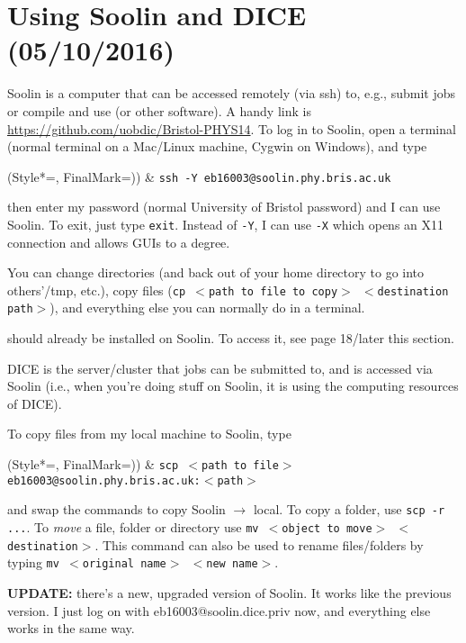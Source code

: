 
\chapter{Using Soolin and DICE (05/10/2016)}
\label{sec:usingsoolindice}

Soolin is a computer that can be accessed remotely (via ssh) to, e.g., submit jobs or compile and use \ROOT (or other software). A handy link is \url{https://github.com/uobdic/Bristol-PHYS14}. To log in to Soolin, open a terminal (normal terminal on a Mac/Linux machine, Cygwin on Windows), and type

\begin{easylist}
\ListProperties(Style*=, FinalMark={)})
& \texttt{ssh -Y eb16003{@}soolin.phy.bris.ac.uk}
\end{easylist}

then enter my password (normal University of Bristol password) and I can use Soolin. To exit, just type \texttt{exit}. Instead of \texttt{-Y}, I can use \texttt{-X} which opens an X11 connection and allows GUIs to a degree.

You can change directories (and back out of your home directory to go into others'/tmp, etc.), copy files (\texttt{cp $<$path to file to copy$>$ $<$destination path$>$}), and everything else you can normally do in a terminal.

\ROOT should already be installed on Soolin. To access it, see page 18/later this section.

DICE is the server/cluster that jobs can be submitted to, and is accessed via Soolin (i.e., when you're doing stuff on Soolin, it is using the computing resources of DICE).

To copy files from my local machine to Soolin, type

\begin{easylist}
\ListProperties(Style*=, FinalMark={)})
& \texttt{scp $<$path to file$>$ eb16003@soolin.phy.bris.ac.uk:$<$path$>$}
\end{easylist}

and swap the commands to copy Soolin $\rightarrow$ local. To copy a folder, use \texttt{scp -r ...}. To \emph{move} a file, folder or directory use \texttt{mv $<$object to move$>$ $<$destination$>$}. This command can also be used to rename files/folders by typing \texttt{mv $<$original name$>$ $<$new name$>$}.

\textbf{UPDATE:} there's a new, upgraded version of Soolin. It works like the previous version. I just log on with eb16003@soolin.dice.priv now, and everything else works in the same way.

